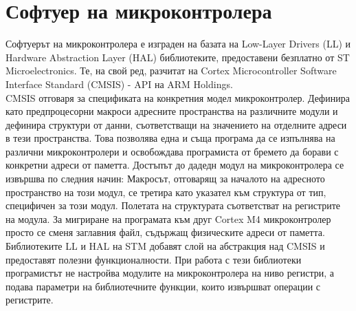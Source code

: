 \chapter{Софтуер на микроконтролера}
\label{firmware_chapter}
\indent{}Софтуерът на микроконтролера е изграден на базата на Low-Layer Drivers (LL) и Hardware Abstraction Layer (HAL) библиотеките, предоставени безплатно от ST Microelectronics. Те, на свой ред, разчитат на Cortex Microcontroller Software Interface Standard (CMSIS) - API на ARM Holdings.\\
\indent{}
CMSIS отговаря за спецификата на конкретния модел микроконтролер. Дефинира като предпроцесорни макроси адресните пространства на различните модули и дефинира структури от данни, съответстващи на значението на отделните адреси в тези пространства.
\cite{mcu_prog_man}
Това позволява една и съща програма да се изпълнява на различни микроконтролери и освобождава програмиста от бремето да борави с конкретни адреси от паметта. Достъпът до дадедн модул на микроконтролера се извършва по следния начин: Макросът, отговарящ за началото на адресното пространство на този модул, се третира като указател към структура от тип, специфичен за този модул. Полетата на структурата съответстват на регистрите на модула. За мигриране на програмата към друг Cortex M4 микроконтролер просто се сменя заглавния файл, съдържащ физическите адреси от паметта.\\
\indent{}
Библиотеките LL и HAL на STM добавят слой на абстракция над CMSIS и предоставят полезни функционалности. При работа с тези библиотеки програмистът не настройва модулите на микроконтролера на ниво регистри, а подава параметри на библиотечните функции, които извършват операции с регистрите.
\cite{ll_hal_man}
